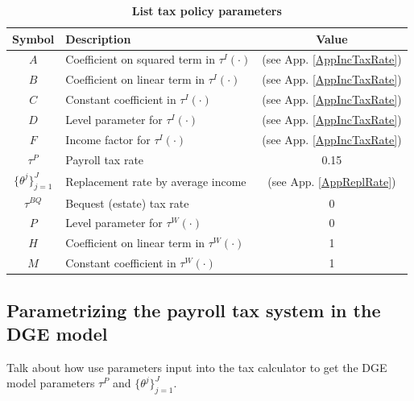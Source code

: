\documentclass[letterpaper,12pt]{article}
\theoremstyle{definition}
\begin{document}
\begin{spacing}{1.5}
    \begin{table}[htbp] \centering \captionsetup{width=4.7in}
    \caption{\label{TaxParams}\textbf{List tax policy parameters}}
      \begin{threeparttable}
      \begin{tabular}{>{\footnotesize}c |>{\footnotesize}l |>{\footnotesize}c}
        \hline\hline
        Symbol & \quad\quad\quad\quad Description & Value \\
        \hline
        $A$ & Coefficient on squared term in $\tau^I(\cdot)$ & (see App. \ref{AppIncTaxRate}) \\
        $B$ & Coefficient on linear term in $\tau^I(\cdot)$ & (see App. \ref{AppIncTaxRate}) \\
        $C$ & Constant coefficient in $\tau^I(\cdot)$ & (see App. \ref{AppIncTaxRate}) \\
        $D$ & Level parameter for $\tau^I(\cdot)$ & (see App. \ref{AppIncTaxRate}) \\
        $F$ & Income factor for $\tau^I(\cdot)$ & (see App. \ref{AppIncTaxRate}) \\
        $\tau^P$ & Payroll tax rate & 0.15 \\
        $\{\theta^j\}_{j=1}^J$ & Replacement rate by average income & (see App. \ref{AppReplRate}) \\
        $\tau^{BQ}$ & Bequest (estate) tax rate & 0 \\
        $P$ & Level parameter for $\tau^W(\cdot)$ & 0 \\
        $H$ & Coefficient on linear term in $\tau^W(\cdot)$ & 1 \\
        $M$ & Constant coefficient in $\tau^W(\cdot)$ & 1 \\
        \hline\hline
      \end{tabular}
      \end{threeparttable}
    \end{table}

\subsection{Parametrizing the payroll tax system in the DGE model}\label{SecPayrollDGE}

Talk about how use parameters input into the tax calculator to get the DGE model parameters  $\tau^P$ and $\{\theta^j\}_{j=1}^J$.


\end{spacing}
\end{document}
